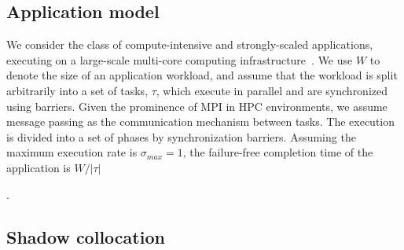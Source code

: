 

\subsection {Application model}
\label{sec:app_model}

We consider the class of compute-intensive and strongly-scaled applications, executing on a large-scale multi-core computing infrastructure~\cite{doe_ascr_exascale_2011}. %
We use $W$ to denote the size of an application workload, and assume that the workload is split arbitrarily into a set of tasks, $\tau$, which execute in parallel and are synchronized using barriers. Given the prominence of MPI in HPC environments, we assume message passing as the communication mechanism between tasks. %
The execution is divided into a set of phases by synchronization barriers. 
Assuming the maximum execution rate is $\sigma_{max}=1$, the failure-free completion time of the application is $W/|\tau|$

 . %


\subsection{Shadow collocation}

